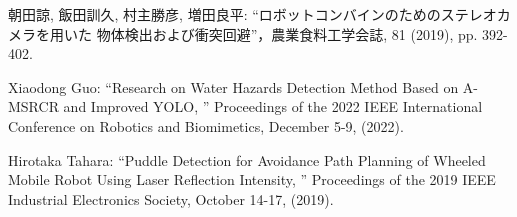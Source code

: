 \documentclass[10pt]{jarticle}
\begin{document}
    



    
    
 
    \vspace{5truemm}
    {\footnotesize
        \begin{thebibliography}{99}

            朝田諒, 飯田訓久, 村主勝彦, 増田良平: ``ロボットコンバインのためのステレオカメラを用いた
            物体検出および衝突回避''，農業食料工学会誌, 81 (2019), pp. 392-402.

            Xiaodong Guo: ``Research on Water Hazards Detection Method Based on A-MSRCR and Improved YOLO, ''
            Proceedings of the 2022 IEEE International Conference on Robotics and Biomimetics, 
            December 5-9, (2022). 

            Hirotaka Tahara: ``Puddle Detection for Avoidance Path Planning of Wheeled Mobile Robot Using Laser Reflection Intensity, ''
            Proceedings of the 2019 IEEE Industrial Electronics Society, 
            October 14-17, (2019). 

            
            
        \end{thebibliography}
    }
    \normalsize
\end{document}
